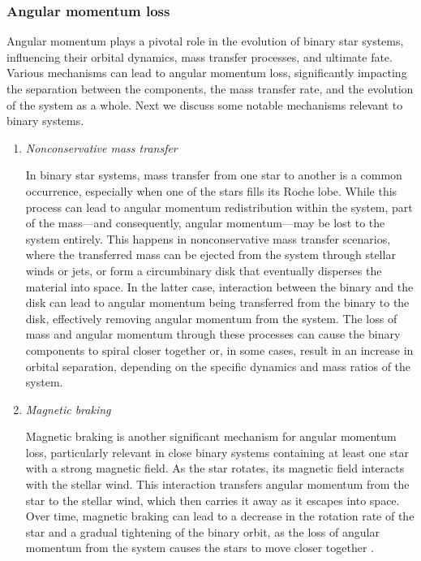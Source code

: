 \documentclass[main.tex]{subfiles}
\begin{document}
    \subsubsection{Angular momentum loss}
    Angular momentum plays a pivotal role in the evolution of binary star systems, influencing their orbital dynamics, mass transfer processes, and ultimate fate. Various mechanisms can lead to angular momentum loss, significantly impacting the separation between the components, the mass transfer rate, and the evolution of the system as a whole. Next we discuss some notable mechanisms relevant to binary systems.
    \begin{enumerate}
        \item \textit{Nonconservative mass transfer}
        
        In binary star systems, mass transfer from one star to another is a common occurrence, especially when one of the stars fills its Roche lobe. While this process can lead to angular momentum redistribution within the system, part of the mass---and consequently, angular momentum---may be lost to the system entirely. This happens in nonconservative mass transfer scenarios, where the transferred mass can be ejected from the system through stellar winds or jets, or form a circumbinary disk that eventually disperses the material into space. In the latter case, interaction between the binary and the disk can lead to angular momentum being transferred from the binary to the disk, effectively removing angular momentum from the system. The loss of mass and angular momentum through these processes can cause the binary components to spiral closer together or, in some cases, result in an increase in orbital separation, depending on the specific dynamics and mass ratios of the system.

        \item \textit{Magnetic braking}

        Magnetic braking is another significant mechanism for angular momentum loss, particularly relevant in close binary systems containing at least one star with a strong magnetic field. As the star rotates, its magnetic field interacts with the stellar wind. This interaction transfers angular momentum from the star to the stellar wind, which then carries it away as it escapes into space. Over time, magnetic braking can lead to a decrease in the rotation rate of the star and a gradual tightening of the binary orbit, as the loss of angular momentum from the system causes the stars to move closer together \citep[e.g.,][]{Gossage_2023}.


\end{enumerate}
\end{document}

